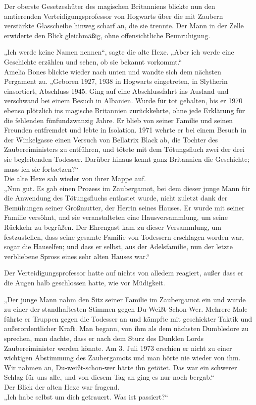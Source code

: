 {Der oberste Gesetzeshüter des magischen Britanniens blickte nun den amtierenden Verteidigungsprofessor von Hogwarts über die mit Zaubern verstärkte Glasscheibe hinweg scharf an, die sie trennte. Der Mann in der Zelle erwiderte den Blick gleichmäßig, ohne offensichtliche Beunruhigung.

„Ich werde keine Namen nennen“, sagte die alte Hexe. „Aber ich werde eine Geschichte erzählen und sehen, ob sie bekannt vorkommt.“\\ Amelia Bones blickte wieder nach unten und wandte sich dem nächsten Pergament zu. „Geboren 1927, 1938 in Hogwarts eingetreten, in Slytherin einsortiert, Abschluss 1945. Ging auf eine Abschlussfahrt ins Ausland und verschwand bei einem Besuch in Albanien. Wurde für tot gehalten, bis er 1970 ebenso plötzlich ins magische Britannien zurückkehrte, ohne jede Erklärung für die fehlenden fünfundzwanzig Jahre. Er blieb von seiner Familie und seinen Freunden entfremdet und lebte in Isolation. 1971 wehrte er bei einem Besuch in der Winkelgasse einen Versuch von Bellatrix Black ab, die Tochter des Zaubereiministers zu entführen, und tötete mit dem Tötungsfluch zwei der drei sie begleitenden Todesser. Darüber hinaus kennt ganz Britannien die Geschichte; muss ich sie fortsetzen?“\\ Die alte Hexe sah wieder von ihrer Mappe auf.\\ „Nun gut. Es gab einen Prozess im Zaubergamot, bei dem dieser junge Mann für die Anwendung des Tötungsfluchs entlastet wurde, nicht zuletzt dank der Bemühungen seiner Großmutter, der Herrin seines Hauses. Er wurde mit seiner Familie versöhnt, und sie veranstalteten eine Hausversammlung, um seine Rückkehr zu begrüßen. Der Ehrengast kam zu dieser Versammlung, um festzustellen, dass seine gesamte Familie von Todessern erschlagen worden war, sogar die Hauselfen; und dass er selbst, aus der Adelsfamilie, nun der letzte verbliebene Spross eines sehr alten Hauses war.“

Der Verteidigungsprofessor hatte auf nichts von alledem reagiert, außer dass er die Augen halb geschlossen hatte, wie vor Müdigkeit.

„Der junge Mann nahm den Sitz seiner Familie im Zaubergamot ein und wurde zu einer der standhaftesten Stimmen gegen Du-Weißt-Schon-Wer. Mehrere Male führte er Truppen gegen die Todesser an und kämpfte mit geschickter Taktik und außerordentlicher Kraft. Man begann, von ihm als dem nächsten Dumbledore zu sprechen, man dachte, dass er nach dem Sturz des Dunklen Lords Zaubereiminister werden könnte. Am 3. Juli 1973 erschien er nicht zu einer wichtigen Abstimmung des Zaubergamots und man hörte nie wieder von ihm. Wir nahmen an, Du-weißt-schon-wer hätte ihn getötet. Das war ein schwerer Schlag für uns alle, und von diesem Tag an ging es nur noch bergab.“\\ Der Blick der alten Hexe war fragend.\\ „Ich habe selbst um dich getrauert. Was ist passiert?“

}
